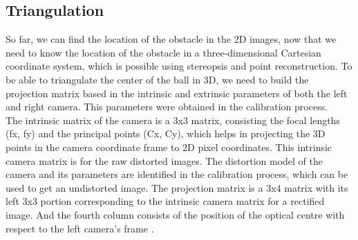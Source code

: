 \subsection{Triangulation}
\label{sec:tri}

So far, we can find the location of the obstacle in the 2D images, now that we need to know the location of the obstacle in a three-dimensional Cartesian coordinate system, which is possible using stereopsis and point reconstruction. To be able to triangulate the center of the ball in 3D, we need to build the projection matrix based in the intrinsic and extrinsic parameters of both the left and right camera. This parameters were obtained in the calibration process. \\

The intrinsic matrix of the camera is a 3x3 matrix, consisting the focal lengths (fx, fy) and the principal points (Cx, Cy), which helps in projecting the 3D points in the camera coordinate frame to 2D pixel coordinates. This intrinsic camera matrix is for the raw distorted images. The distortion model of the camera and its parameters are identified in the calibration process, which can be used to get an undistorted image. The projection matrix is a 3x4 matrix with its left 3x3 portion corresponding to the intrinsic camera matrix for a rectified image. And the fourth column consists of the position of the optical centre with respect to the left camera's frame \cite{cam}.\\

